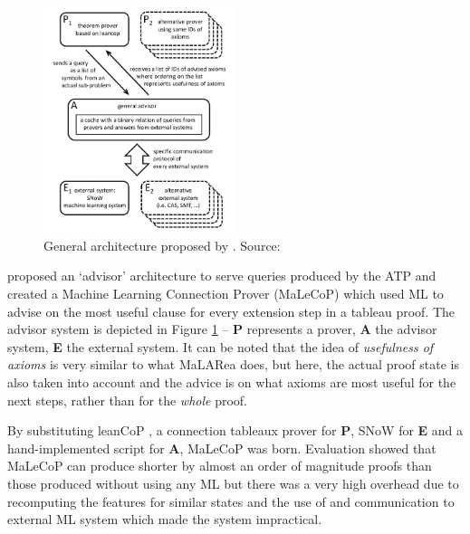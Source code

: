 \documentclass{article}
\begin{document}
\begin{figure}[t]
    \centering
    \includegraphics[width=0.5\textwidth]{malecop_arch.png}
    \caption{General architecture proposed by \cite{malecop}. Source: \cite{malecop}}
    \label{fig:malecop}
\end{figure}

\cite{malecop} proposed an `advisor' architecture to serve queries produced by
the ATP and created a Machine Learning Connection Prover (MaLeCoP) which used
ML to advise on the most useful clause for every extension step in a tableau
proof. The advisor system is depicted in Figure \ref{fig:malecop} -- \textbf{P}
represents a prover, \textbf{A} the advisor system, \textbf{E} the external
system. It can be noted that the idea of \emph{usefulness of axioms} is very
similar to what MaLARea does, but here, the actual proof state is also taken
into account and the advice is on what axioms are most useful for the next
steps, rather than for the \emph{whole} proof.

By substituting leanCoP \citep{leancop}, a connection tableaux prover for
\textbf{P}, SNoW \citep{SNoW} for \textbf{E} and a hand-implemented script for
\textbf{A}, MaLeCoP was born. Evaluation showed that MaLeCoP can produce
shorter by almost an order of magnitude proofs than those produced without
using any ML but there was a very high overhead due to recomputing the features
for similar states and the use of and communication to external ML system which
made the system impractical.
\end{document}
